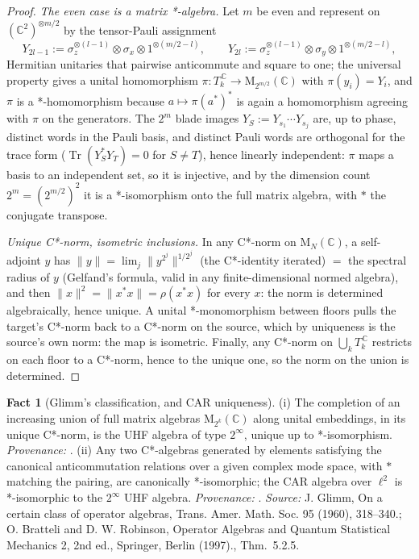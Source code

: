 \documentclass[11pt]{article}
\theoremstyle{definition}
\newtheorem{fact}[theorem]{Fact}
\theoremstyle{plain}
\providecommand{\C}{}\renewcommand{\C}{\mathbb{C}}
\providecommand{\Mat}{}\renewcommand{\Mat}{\mathrm{M}}
\begin{document}
\begin{proof}
\emph{The even case is a matrix *-algebra.} Let $m$ be even and represent on $(\C^2)^{\otimes m/2}$ by the tensor-Pauli assignment
\[
Y_{2l-1} := \sigma_z^{\otimes (l-1)} \otimes \sigma_x \otimes 1^{\otimes (m/2 - l)}, \qquad
Y_{2l} := \sigma_z^{\otimes (l-1)} \otimes \sigma_y \otimes 1^{\otimes (m/2 - l)} ,
\]
Hermitian unitaries that pairwise anticommute and square to one; the universal property gives a unital homomorphism $\pi : T_k^{\,\C} \to \Mat_{2^{m/2}}(\C)$ with $\pi(y_i) = Y_i$, and $\pi$ is a *-homomorphism because $a \mapsto \pi(a^*)^*$ is again a homomorphism agreeing with $\pi$ on the generators. The $2^m$ blade images $Y_S := Y_{s_1} \cdots Y_{s_j}$ are, up to phase, distinct words in the Pauli basis, and distinct Pauli words are orthogonal for the trace form ($\operatorname{Tr}(Y_S^* Y_T) = 0$ for $S \neq T$), hence linearly independent: $\pi$ maps a basis to an independent set, so it is injective, and by the dimension count $2^m = (2^{m/2})^2$ it is a *-isomorphism onto the full matrix algebra, with $*$ the conjugate transpose.

\emph{Unique C*-norm, isometric inclusions.} In any C*-norm on $\Mat_N(\C)$, a self-adjoint $y$ has $\|y\| = \lim_j \|y^{2^j}\|^{1/2^j}$ (the C*-identity iterated) $=$ the spectral radius of $y$ (Gelfand's formula, valid in any finite-dimensional normed algebra), and then $\|x\|^2 = \|x^*x\| = \rho(x^* x)$ for every $x$: the norm is determined algebraically, hence unique. A unital *-monomorphism between floors pulls the target's C*-norm back to a C*-norm on the source, which by uniqueness is the source's own norm: the map is isometric. Finally, any C*-norm on $\bigcup_k T_k^{\,\C}$ restricts on each floor to a C*-norm, hence to the unique one, so the norm on the union is determined.

\end{proof}

\begin{fact}[Glimm's classification, and CAR uniqueness]\label{c:tower.glimms-classification-car-uniqueness}
(i) The completion of an increasing union of full matrix algebras $\Mat_{2^k}(\C)$ along unital embeddings, in its unique C*-norm, is the UHF algebra of type $2^\infty$, unique up to *-isomorphism. \emph{Provenance:} \cite{Glimm1960}. (ii) Any two C*-algebras generated by elements satisfying the canonical anticommutation relations over a given complex mode space, with $*$ matching the pairing, are canonically *-isomorphic; the CAR algebra over $\ell^2$ is *-isomorphic to the $2^\infty$ UHF algebra. \emph{Provenance:} \cite[Thm.~5.2.5]{BratteliRobinson1997}.
\emph{Source:} J. Glimm, On a certain class of operator algebras, Trans. Amer. Math. Soc. 95 (1960), 318--340.; O. Bratteli and D. W. Robinson, Operator Algebras and Quantum Statistical Mechanics 2, 2nd ed., Springer, Berlin (1997)., Thm.~5.2.5.
\end{fact}
\end{document}
